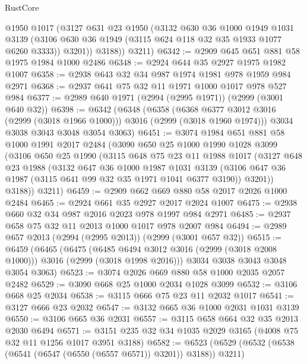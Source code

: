\begin{lexlean}{RustCore}
\begin{coremodule}
          @1950
          @1017
          (@3127
            @631
            @23
            @1950
            (@3132
              @630
              @36
              @1000
              @1949
              @1031
              @3139
              (@3106 @630 @36 @1949 (@3115 @624 @118 @32 @35 @1933 @1077 @6260 @3333))
              @3201))
          @3188))
      @3211)
@6342 := @2909 @645 @651 @881 @58 @1975 @1984 @1000 @2486
@6348 := @2924 @644 @35 @2927 @1975 @1982 @1007
@6358 := @2938 @643 @32 @34 @987 @1974 @1981 @978 @1959 @984 @2971
@6368 := @2937 @641 @75 @32 @11 @1971 @1000 @1017 @978 @527 @984
@6377 := @2989 @640 @1971 (@2994 (@2995 @1971)) (@2999 (@3001 @640 @32))
@6398 := @6342
    (@6348
      (@6358
        (@6368 @6377 @3012 @3016 (@2999 (@3018 @1966 @1000)))
        @3016
        (@2999 (@3018 @1960 @1974)))
      @3034
      @3038
      @3043
      @3048
      @3054
      @3063)
@6451 := @3074
    @1984
    @651
    @881
    @58
    @1000
    @1991
    @2017
    @2484
    (@3090
      @650
      @25
      @1000
      @1990
      @1028
      @3099
      (@3106
        @650
        @25
        @1990
        (@3115
          @648
          @75
          @23
          @11
          @1988
          @1017
          (@3127
            @648
            @23
            @1988
            (@3132
              @647
              @36
              @1000
              @1987
              @1031
              @3139
              (@3106 @647 @36 @1987 (@3115 @641 @99 @32 @35 @1971 @1041 @6377 @3190))
              @3201))
          @3188))
      @3211)
@6459 := @2909 @662 @669 @880 @58 @2017 @2026 @1000 @2484
@6465 := @2924 @661 @35 @2927 @2017 @2024 @1007
@6475 := @2938 @660 @32 @34 @987 @2016 @2023 @978 @1997 @984 @2971
@6485 := @2937 @658 @75 @32 @11 @2013 @1000 @1017 @978 @2007 @984
@6494 := @2989 @657 @2013 (@2994 (@2995 @2013)) (@2999 (@3001 @657 @32))
@6515 := @6459
    (@6465
      (@6475
        (@6485 @6494 @3012 @3016 (@2999 (@3018 @2008 @1000)))
        @3016
        (@2999 (@3018 @1998 @2016)))
      @3034
      @3038
      @3043
      @3048
      @3054
      @3063)
@6523 := @3074 @2026 @669 @880 @58 @1000 @2035 @2057 @2482
@6529 := @3090 @668 @25 @1000 @2034 @1028 @3099
@6532 := @3106 @668 @25 @2034
@6538 := @3115 @666 @75 @23 @11 @2032 @1017
@6541 := @3127 @666 @23 @2032
@6547 := @3132 @665 @36 @1000 @2031 @1031 @3139
@6550 := @3106 @665 @36 @2031
@6557 := @3115 @658 @664 @32 @35 @2013 @2030 @6494
@6571 := @3151 @235 @32 @34 @1035 @2029 @3165 (@4008 @75 @32 @11 @1256 @1017 @3951 @3188)
@6582 := @6523 (@6529 (@6532 (@6538 (@6541 (@6547 (@6550 (@6557 @6571)) @3201)) @3188)) @3211)

\end{coremodule}
\end{lexlean}
